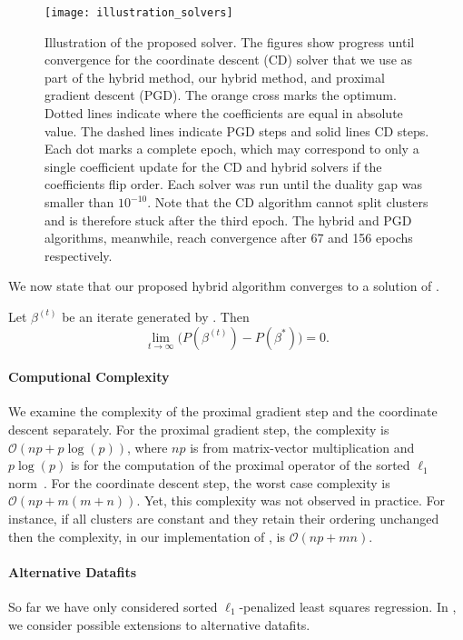 \begin{figure*}[htb]
  \centering
  \texttt{[image: illustration\_solvers]}
  \caption{Illustration of the proposed solver. The figures show progress
    until convergence for the coordinate descent (CD) solver that we use as part
    of the hybrid method, our hybrid method, and  proximal gradient descent
    (PGD). The orange cross marks the optimum. Dotted lines indicate where the
    coefficients are equal in absolute value. The dashed lines indicate PGD
    steps and solid lines CD steps. Each dot marks a complete epoch, which may
    correspond to only a single coefficient update for the CD and hybrid
    solvers if the coefficients flip order. Each solver was run until the duality
    gap was smaller than \(10^{-10}\). Note that the CD algorithm cannot split clusters
    and is therefore stuck after the third epoch. The hybrid and PGD algorithms,
    meanwhile, reach convergence after 67 and 156 epochs respectively.}
  \label{fig:illustration-solver}
\end{figure*}

We now state that our proposed hybrid algorithm converges to a solution of .

\begin{lemma}
  \label{lem:convergence}
  Let \(\beta^{(t)}\) be an iterate generated by . Then
  \[
    \lim_{t \rightarrow \infty}\big(P(\beta^{(t)}) - P(\beta^*)\big) = 0.
  \]
\end{lemma}

\paragraph{Computional Complexity}
We examine the complexity of the proximal gradient step and the coordinate
descent separately. For the proximal gradient step, the complexity is $\mathcal{O}(np
+ p\log(p))$, where $np$ is from matrix-vector multiplication and $p\log(p)$ is
for the computation of the proximal operator of the sorted $\ell_1$ norm~\parencite{zeng2014ordered}.
For the coordinate descent step, the worst case complexity is  $\mathcal{O}(np + m(m + n))$.
Yet, this complexity was not observed in practice. For instance, if all clusters are
constant and they retain their ordering unchanged then the complexity, in our
implementation of , is $\mathcal{O}(np + mn)$.


\paragraph{Alternative Datafits}
So far we have only considered sorted \(\ell_1\)-penalized least squares regression.
In , we consider possible extensions to alternative datafits.

